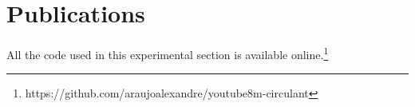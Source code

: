 \chapter{Publications}
\label{chapter:publications}


All the code used in this experimental section is available online.\footnote{https://github.com/araujoalexandre/youtube8m-circulant}
